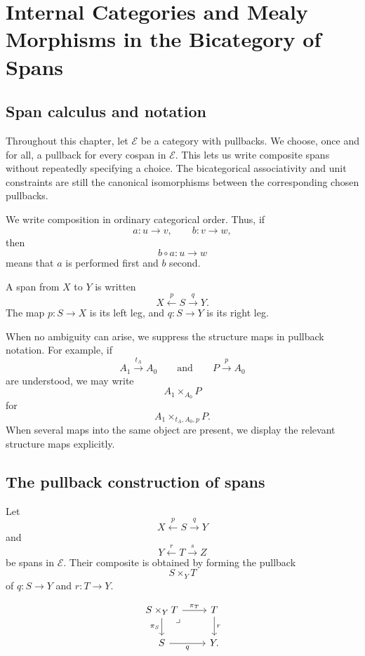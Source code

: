 \chapter{Internal Categories and Mealy Morphisms in the Bicategory of Spans}
\label{ch:spans-internal-categories-mealy}

\section{Span calculus and notation}
\label{sec:span-calculus-notation}

Throughout this chapter, let \(\mathcal E\) be a category with pullbacks. We choose, once and for all, a pullback for every cospan in \(\mathcal E\). This lets us write composite spans without repeatedly specifying a choice. The bicategorical associativity and unit constraints are still the canonical isomorphisms between the corresponding chosen pullbacks.

We write composition in ordinary categorical order. Thus, if
\[
a:u\to v,
\qquad
b:v\to w,
\]
then
\[
b\circ a:u\to w
\]
means that \(a\) is performed first and \(b\) second.

A span from \(X\) to \(Y\) is written
\[
X \xleftarrow{p} S \xrightarrow{q} Y.
\]
The map \(p:S\to X\) is its left leg, and \(q:S\to Y\) is its right leg.

When no ambiguity can arise, we suppress the structure maps in pullback notation. For example, if
\[
A_1\xrightarrow{t_A}A_0
\qquad\text{and}\qquad
P\xrightarrow{p}A_0
\]
are understood, we may write
\[
A_1\times_{A_0}P
\]
for
\[
A_1\times_{t_A,A_0,p}P.
\]
When several maps into the same object are present, we display the relevant structure maps explicitly.

\section{The pullback construction of spans}
\label{sec:pullback-construction-spans}

Let
\[
X \xleftarrow{p} S \xrightarrow{q} Y
\]
and
\[
Y \xleftarrow{r} T \xrightarrow{s} Z
\]
be spans in \(\mathcal E\). Their composite is obtained by forming the pullback
\[
S\times_Y T
\]
of \(q:S\to Y\) and \(r:T\to Y\).

\[
\begin{tikzcd}
S\times_Y T \arrow[r, "\pi_T"] \arrow[d, "\pi_S"'] \arrow[dr, phantom, "\lrcorner", very near start]
&
T \arrow[d, "r"]
\\
S \arrow[r, "q"'] & Y.
\end{tikzcd}
\]

